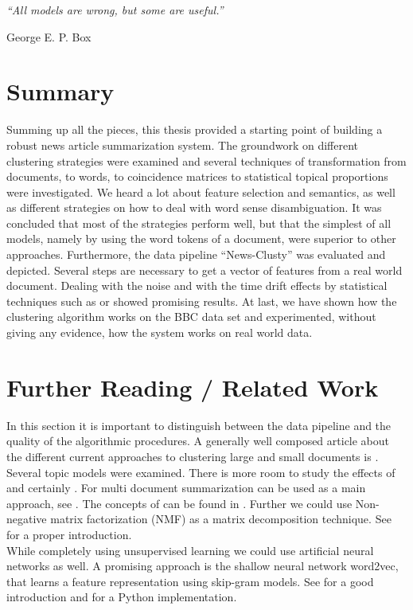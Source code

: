 \epigraph{\emph{
  ``All models are wrong, but some are useful.''
}}{ George E. P. Box }

\section{Summary}
\label{sec:summary}
Summing up all the pieces, this thesis provided a starting point of building a robust  news article summarization system. The groundwork on different clustering strategies were examined and several techniques of transformation from documents, to words, to coincidence matrices to statistical topical proportions were investigated. We heard a lot about feature selection and semantics, as well as different strategies on how to deal with word sense disambiguation. It was concluded that most of the strategies perform well, but that the simplest of all models, namely by using the word tokens of a document, were superior to other approaches. Furthermore, the data pipeline ``News-Clusty'' was evaluated and depicted. Several steps are necessary to get a vector of features from a real world document. Dealing with the noise and with the time drift effects by statistical techniques such as \lsa{} or \lda{} showed promising results. At last, we have shown how the clustering algorithm works on the BBC data set and experimented, without giving any evidence, how the system works on real world data.

\section{Further Reading / Related Work}
\label{sec:further_reading}
In this section it is important to distinguish between the data pipeline and the quality of the algorithmic procedures. A generally well composed article about the different current approaches to clustering large and small documents is \cite{NextFrontierClustering2013}.\\

Several topic models were examined. There is more room to study the effects of \lda{} and certainly \hdp{}. For multi document summarization \lda{} can be used as a main approach, see \cite{MultiDocSumLDA2008}. The concepts of \hdpfull{} can be found in \cite{NonParametricBayes2007, HDP2006}. Further we could use Non-negative matrix factorization (NMF) as a matrix decomposition technique. See \cite{NMF1999} for a proper introduction.\\

While completely using unsupervised learning we could use artificial neural networks as well. A promising approach is the shallow neural network word2vec, that learns a feature representation using skip-gram models. See \cite{Word2Vec2014} for a good introduction and \cite{gensim2010} for a Python implementation.\\

